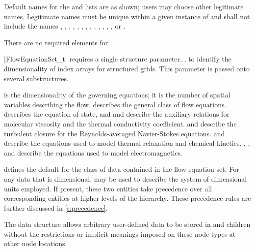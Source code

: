 \begin{notes}
\item Default names for the  and
       lists are as shown; users may choose
      other legitimate names.
      Legitimate names must be unique within a given instance of
       and shall not include the names
      , ,
      , ,
      , , ,
      , ,
      , ,
      , , or
      .
\item There are no required elements for .
\end{notes}

|FlowEquationSet_t| requires a single structure parameter,
, to identify the dimensionality of index arrays for
structured grids.
This parameter is passed onto several substructures.

 is the dimensionality of the governing
equations; it is the number of spatial variables describing the flow.
 describes the general class of flow equations.
 describes the equation of state, and
 and  describe the
auxiliary relations for molecular viscosity and the thermal conductivity
coefficient.
 and  describe the
turbulent closure for the Reynolds-aver\-aged Navier-Stokes equations.
 and  describe
the equations used to model thermal relaxation and chemical kinetics.
, , and
 describe the equations used to model
electromagnetics.

 defines the default for the class of data contained in
the flow-equation set.
For any data that is dimensional,  may be used to
describe the system of dimensional units employed.
If present, these two entities take precedence over all corresponding
entities at higher levels of the hierarchy.
These precedence rules are further discussed in \autoref{s:precedence}.

The  data structure allows arbitrary
user-defined data to be stored in  and
 children without the restrictions or implicit
meanings imposed on these node types at other node locations.

